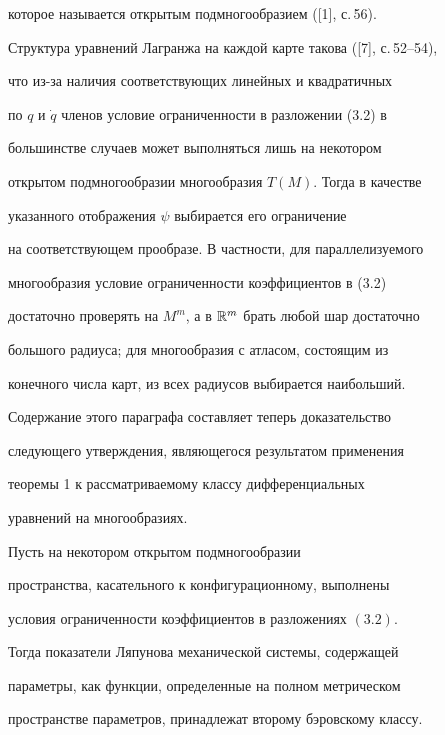 которое называется открытым подмногообразием ([1], с.\,56). 


 


Структура уравнений Лагранжа на каждой карте такова ([7], с.\,52--54), 


что из-за наличия соответствующих линейных и квадратичных 


по $q$ и $\Dot q$ членов условие ограниченности в разложении (3.2) в 


большинстве случаев может выполняться лишь на некотором 


открытом подмногообразии многообразия $T(M)$. Тогда в качестве 


указанного отображения $\psi$ выбирается его ограничение 


на соответствующем прообразе. В частности, для параллелизуемого 


многообразия условие ограниченности коэффициентов в (3.2) 


достаточно проверять на $M^m$, а в $\Bbb R^m$ брать любой шар достаточно 


большого радиуса; для многообразия с атласом, состоящим из 


конечного числа карт, из всех радиусов выбирается наибольший. 


 


Содержание этого параграфа составляет теперь доказательство 


следующего утверждения, являющегося результатом применения 


теоремы 1 к рассматриваемому классу дифференциальных 


уравнений на многообразиях. 


 


\begin{thm} 


Пусть на некотором открытом подмногообразии 


пространства, касательного к конфигурационному, выполнены 


условия ограниченности коэффициентов в разложениях $(3.2)$. 


Тогда показатели Ляпунова механической системы, содержащей 


параметры, как функции, определенные на полном метрическом 


пространстве параметров, принадлежат второму бэровскому классу. 


\end{thm} 


